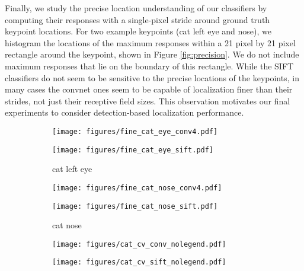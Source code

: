 \documentclass{article} \usepackage{nips14submit_e,times}
\begin{document}
Finally, we study the precise location understanding of our classifiers
by computing their responses with a single-pixel stride around
ground truth keypoint locations.
For two example keypoints (cat left eye and nose), we histogram the locations of
the maximum responses within a 21 pixel by 21 pixel rectangle around the
keypoint, shown in Figure \ref{fig:precision}.
We do not include maximum responses that lie on the boundary of this rectangle.
While the SIFT classifiers do not seem to be sensitive to the precise locations of
the keypoints, in many cases the convnet ones seem to be capable of localization
finer than their strides, not just their receptive field sizes. This observation 
motivates our final experiments to consider detection-based localization performance.

\begin{figure}[t]
\centering
\begin{minipage}{0.4\textwidth}
\centering
\begin{subfigure}{0.45\textwidth}
    \texttt{[image: figures/fine\_cat\_eye\_conv4.pdf]}

\texttt{[image: figures/fine\_cat\_eye\_sift.pdf]}
\caption{cat left eye}
\end{subfigure}
\hspace{1em}
\begin{subfigure}{0.45\textwidth}
\texttt{[image: figures/fine\_cat\_nose\_conv4.pdf]}

\texttt{[image: figures/fine\_cat\_nose\_sift.pdf]}
\caption{cat nose}
\end{subfigure}
\label{fig:precision}
\end{minipage}
\hspace{2em}
\begin{minipage}{0.4\textwidth}
\centering
\begin{subfigure}{0.45\textwidth}
\texttt{[image: figures/cat\_cv\_conv\_nolegend.pdf]}
\caption{}
\end{subfigure}
\begin{subfigure}{0.45\textwidth}
\texttt{[image: figures/cat\_cv\_sift\_nolegend.pdf]}
\caption{}
\end{subfigure}
\label{fig:cv}
\end{minipage}
\end{figure}
\end{document}
